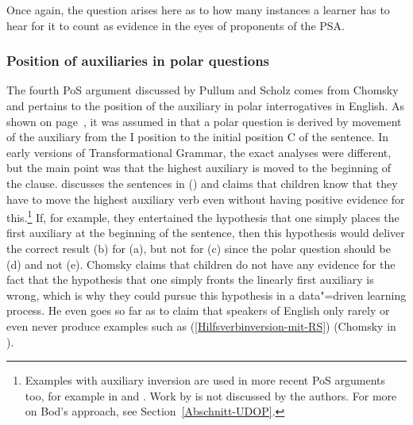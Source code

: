 Once again, the question arises here as to how many instances a learner has to hear for it to count as evidence in the eyes
of proponents of the PSA.

\subsubsection{Position of auxiliaries in polar questions}
\label{Abschnitt-Hilfsverbumstellung}

The fourth PoS argument discussed by Pullum and Scholz comes from Chomsky and pertains to the
position of the auxiliary in polar interrogatives in English. As shown on page~\pageref{Seite-GB-Entscheidungsfragen-Englisch},
it was assumed in \gbt that a polar question is derived by movement of the auxiliary from the I position to the initial position C of
the sentence. In early versions of Transformational Grammar, the exact analyses were different, but the main point was that the
highest auxiliary is moved to the beginning of the clause. 
 \citet[--33]{Chomsky71a-u}
discusses the sentences in () and claims that children know that they have to move the highest auxiliary verb even without having
positive evidence for this.\footnote{%
	Examples with auxiliary inversion are used in more recent PoS arguments too, for example in 
   and . Work by \citet{Bod2009a} is not discussed by the authors.
  For more on Bod's approach, see Section~\ref{Abschnitt-UDOP}.%
} If, for example, they entertained the hypothesis that one simply places the first auxiliary at the beginning of the sentence, then
this hypothesis would deliver the correct result (b) for (a), but not for (c) since the polar question should
be (d) and not (e).
\eal
{}
\zl
Chomsky claims that children do not have any evidence for the fact that the hypothesis that one
simply fronts the linearly first auxiliary is wrong, which is why they could pursue this hypothesis in a data"=driven learning process. He even goes so
far as to claim that speakers of English only rarely or even never produce examples such as (\ref{Hilfsverbinversion-mit-RS})
(Chomsky in
). 
